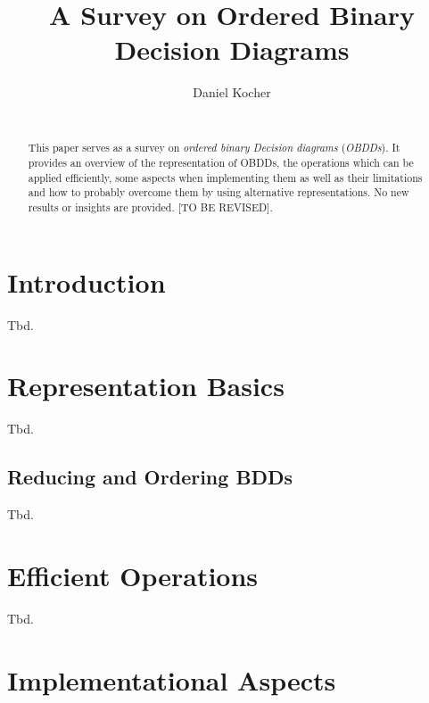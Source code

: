\documentclass{vldb}
\begin{document}
\title{A Survey on Ordered Binary Decision Diagrams}


\author{
\alignauthor
	Daniel Kocher\\
    \\
}

\maketitle

\begin{abstract}
This paper serves as a survey on \textit{ordered binary Decision diagrams}
(\textit{OBDDs}). It provides an overview of the representation of OBDDs, the
operations which can be applied efficiently, some aspects when implementing them
as well as their limitations and how to probably overcome them by using
alternative representations. No new results or insights are provided.  [TO BE
REVISED].
\end{abstract}

\section{Introduction}
\label{sec:introduction}

Tbd.

\section{Representation Basics}
\label{sec:representation-basics}

Tbd.

\subsection{Reducing and Ordering BDDs}
\label{subsec:reducing-and-ordering-bdds}

Tbd.

\section{Efficient Operations}
\label{sec:efficient-operations}

Tbd.

\section{Implementational Aspects}
\label{sec:implementation-aspects}
\end{document}
